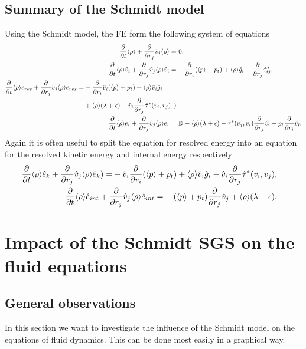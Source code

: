 \subsection{Summary of the Schmidt model}
Using the Schmidt model, the FE form the following system of equations
\begin{align}
\frac{\partial}{\partial t}\langle \rho \rangle + \frac{\partial}{\partial r_j}\hat{v}_j\langle \rho \rangle =&\ 0,\\
\frac{\partial}{\partial t}\langle \rho \rangle\hat{v}_i + \frac{\partial}{\partial r_j}\hat{v}_j\langle \rho \rangle\hat{v}_i =&
-\frac{\partial}{\partial r_i}(\langle p \rangle+p_t)+\langle \rho \rangle\hat{g}_i
-\frac{\partial}{\partial r_j}\hat{\tau}^*_{ij},
\\
\begin{split}
\frac{\partial}{\partial t}\langle \rho \rangle e_{res}+\frac{\partial}{\partial r_j}\hat{v}_j\langle \rho \rangle e_{res}=&
-\frac{\partial}{\partial r_i}\hat{v}_i(\langle p \rangle+p_t)
+\langle \rho \rangle\hat{v}_i\hat{g}_i\\
&+\langle \rho \rangle(\lambda+\epsilon)
-\hat{v}_i\frac{\partial}{\partial r_j}\hat{\tau}^*(v_i,v_j),
)
\end{split}
\\
\frac{\partial}{\partial t}\langle \rho \rangle e_t+\frac{\partial}{\partial r_j}\hat{v}_j
\langle \rho \rangle e_t=&\ \mathbb{D}-\langle \rho \rangle(\lambda+\epsilon)
-\hat{\tau}^*(v_j,v_i)\frac{\partial}{\partial r_j}\hat{v_i}-p_t\frac{\partial}{\partial r_i}\hat{v_i}.
\end{align}
Again it is often useful to split the equation for resolved energy into an
equation for the resolved kinetic energy and internal energy respectively
\begin{align}
\begin{split}
\frac{\partial}{\partial t}\langle \rho \rangle \hat{e}_k+\frac{\partial}{\partial r_j}\hat{v}_j \langle \rho \rangle \hat{e}_k) =& 
-\hat{v}_i \frac{\partial}{\partial r_i}(\langle p \rangle+p_t)
+\langle \rho \rangle \hat{v}_i \hat{g}_i
-\hat{v}_i\frac{\partial}{\partial r_j}\hat{\tau}^*(v_i,v_j),
\end{split}
\\
\begin{split}
\frac{\partial}{\partial t}\langle \rho \rangle \hat{e}_{int}+\frac{\partial}{\partial r_j}\hat{v}_j \langle \rho \rangle \hat{e}_{int} =&
-(\langle p \rangle+p_t) \frac{\partial}{\partial r_j}\hat{v}_j
+\langle \rho \rangle(\lambda+\epsilon).
\end{split}
\end{align}

\section{Impact of the Schmidt SGS on the fluid equations}\label{ImpactSGS}
\subsection{General observations}
In this section we want to investigate the influence of the Schmidt model on
the equations of fluid dynamics. This can be done most easily in a graphical
way.

